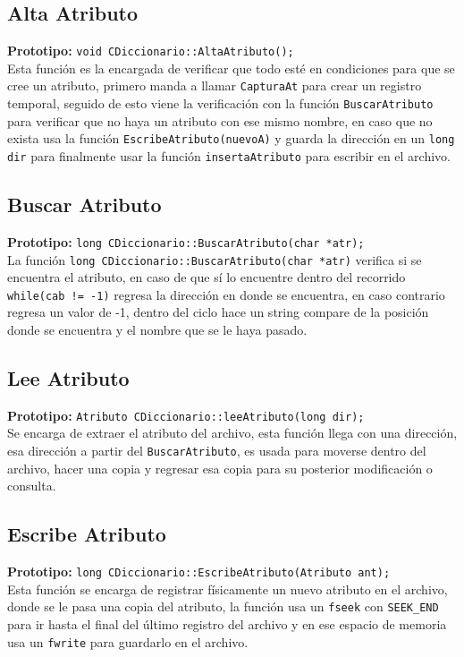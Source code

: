 \documentclass[12pt]{article}
\begin{document}
{}
\subsection*{Alta Atributo}
\textbf{Prototipo:} \verb|void CDiccionario::AltaAtributo();|\\
Esta función es la encargada de verificar que todo esté en 
condiciones para que se cree un atributo, primero manda a 
llamar \verb|CapturaAt| para crear un registro temporal, 
seguido de esto viene la verificación con la función 
\verb|BuscarAtributo| para verificar que no haya un atributo 
con ese mismo nombre, en caso que no exista usa la función 
\verb|EscribeAtributo(nuevoA)| y guarda la dirección en un 
\verb|long dir| para finalmente usar la función 
\verb|insertaAtributo| para escribir en el archivo.

{}
\subsection*{Buscar Atributo}
\textbf{Prototipo:} \verb|long CDiccionario::BuscarAtributo(char *atr);|\\
La función \verb|long CDiccionario::BuscarAtributo(char *atr)| 
verifica si se encuentra el atributo, en caso de que sí lo 
encuentre dentro del recorrido \verb|while(cab != -1)| regresa 
la dirección en donde se encuentra, en caso contrario regresa 
un valor de -1, dentro del ciclo hace un string compare de 
la posición donde se encuentra y el nombre que se le haya pasado.

{}
\subsection*{Lee Atributo}
\textbf{Prototipo:} \verb|Atributo CDiccionario::leeAtributo(long dir);|\\
Se encarga de extraer el atributo del archivo, esta función 
llega con una dirección, esa dirección a partir del 
\verb|BuscarAtributo|, es usada para moverse dentro del archivo, 
hacer una copia y regresar esa copia para su posterior 
modificación o consulta.

{}
\subsection*{Escribe Atributo}
\textbf{Prototipo:} \verb|long CDiccionario::EscribeAtributo(Atributo ant);|\\
Esta función se encarga de registrar físicamente un nuevo 
atributo en el archivo, donde se le pasa una copia del atributo, 
la función usa un \verb|fseek| con \verb|SEEK_END| para ir 
hasta el final del último registro del archivo y en ese espacio 
de memoria usa un \verb|fwrite| para guardarlo en el archivo.
\end{document}
